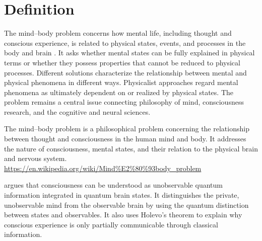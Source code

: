 \documentclass[a4paper]{article}
\title{}
\date{}
\begin{document}
    \maketitle
    
    \section{Definition}
    
    
    The mind--body problem concerns how mental life, including thought and conscious experience, is related to physical states, events, and processes in the body and brain \cite{chambliss-2018-the-mind-body-problem}. It asks whether mental states can be fully explained in physical terms or whether they possess properties that cannot be reduced to physical processes. Different solutions characterize the relationship between mental and physical phenomena in different ways. Physicalist approaches regard mental phenomena as ultimately dependent on or realized by physical states. The problem remains a central issue connecting philosophy of mind, consciousness research, and the cognitive and neural sciences.
    
    The mind–body problem is a philosophical problem concerning the relationship between thought and consciousness in the human mind and body. It addresses the nature of consciousness, mental states, and their relation to the physical brain and nervous system.
    \url{https://en.wikipedia.org/wiki/Mind%E2%80%93body_problem}
    
    \cite{georgiev-2020-quantum-information-theoretic-approach-to-the-mind-brain-problem}  argues that consciousness can be understood as unobservable quantum information integrated in quantum brain states. It distinguishes the private, unobservable mind from the observable brain by using the quantum distinction between states and observables. It also uses Holevo’s theorem to explain why conscious experience is only partially communicable through classical information.
    
    
    
\end{document}
